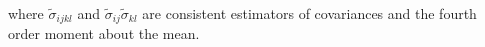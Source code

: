 \noindent where
$\tilde{\sigma}_{ijkl}$
and
$\tilde{\sigma}_{ij} \tilde{\sigma}_{kl}$
are consistent estimators
of covariances and the fourth order moment about the mean.
